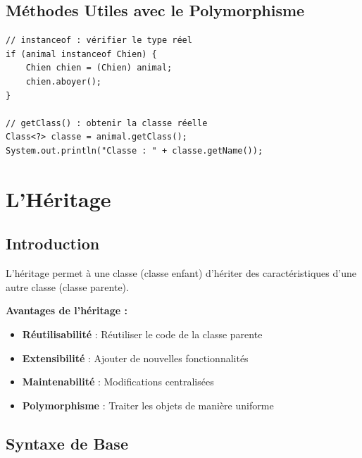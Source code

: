 \documentclass[11pt,a4paper]{article}
\begin{document}
\subsection{Méthodes Utiles avec le Polymorphisme}

\begin{lstlisting}
// instanceof : vérifier le type réel
if (animal instanceof Chien) {
    Chien chien = (Chien) animal;
    chien.aboyer();
}

// getClass() : obtenir la classe réelle
Class<?> classe = animal.getClass();
System.out.println("Classe : " + classe.getName());
\end{lstlisting}

\newpage

\section{L'Héritage}

\subsection{Introduction}

L'héritage permet à une classe (classe enfant) d'hériter des caractéristiques d'une autre classe (classe parente).

\begin{importantbox}
\textbf{Avantages de l'héritage :}
\begin{itemize}
    \item \textbf{Réutilisabilité} : Réutiliser le code de la classe parente
    \item \textbf{Extensibilité} : Ajouter de nouvelles fonctionnalités
    \item \textbf{Maintenabilité} : Modifications centralisées
    \item \textbf{Polymorphisme} : Traiter les objets de manière uniforme
\end{itemize}
\end{importantbox}

\subsection{Syntaxe de Base}
\end{document}
